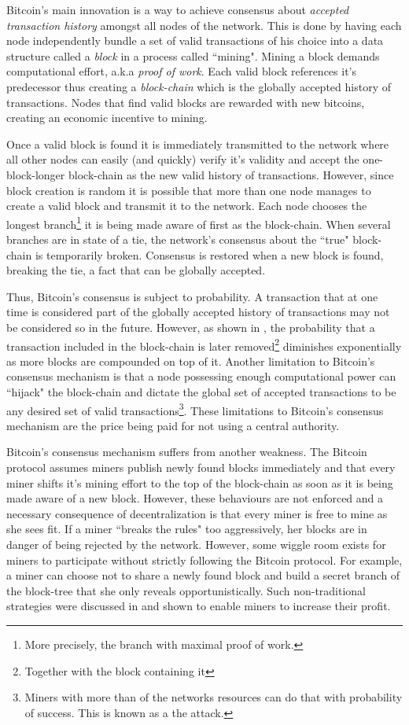 \documentclass[letterpaper,12pt]{report}
\begin{document}
Bitcoin's main innovation is a way to achieve consensus about \emph{accepted transaction history} amongst all nodes of the network. This is done by having each node independently bundle a set of valid transactions of his choice into a data structure called a \textit{block} in a process called ``mining". Mining a block demands computational effort, a.k.a \textit{proof of work}. Each valid block references it's predecessor thus creating a \textit{block-chain} which is the globally accepted history of transactions. Nodes that find valid blocks are rewarded with new bitcoins, creating an economic incentive to mining.

Once a valid block is found it is immediately transmitted to the network where all other nodes can easily (and quickly) verify it's validity and accept the one-block-longer block-chain as the new valid history of transactions. However, since block creation is random it is possible that more than one node manages to create a valid block and transmit it to the network. Each node chooses the longest branch\footnote{More precisely, the branch with maximal proof of work.} it is being made aware of first as the block-chain. When several branches are in state of a tie, the network's consensus about the ``true" block-chain is temporarily broken. Consensus is restored when a new block is found, breaking the tie, a fact that can be globally accepted. 

Thus, Bitcoin's consensus is subject to probability. A transaction that at one time is considered part of the globally accepted history of transactions may not be considered so in the future. However, as shown in \cite{Bitcoin}, the probability that a transaction included in the block-chain is later removed\footnote{Together with the block containing it} diminishes exponentially as more blocks are compounded on top of it. Another limitation to Bitcoin's consensus mechanism is that a node possessing enough computational power can ``hijack" the block-chain and dictate the global set of accepted transactions to be any desired set of valid transactions\footnote{Miners with more than  of the networks resources can do that with  probability of success. This is known as a the  attack.}. These limitations to Bitcoin's consensus mechanism are the price being paid for not using a central authority. 

Bitcoin's consensus mechanism suffers from another weakness. The Bitcoin protocol assumes miners publish newly found blocks immediately and that every miner shifts it's mining effort to the top of the block-chain as soon as it is being made aware of a new block. However, these behaviours are not enforced and a necessary consequence of decentralization is that every miner is free to mine as she sees fit. If a miner ``breaks the rules" too aggressively, her blocks are in danger of being rejected by the network. However, some wiggle room exists for miners to participate without strictly following the Bitcoin protocol. For example, a miner can choose not to share a newly found block and build a secret branch of the block-tree that she only reveals opportunistically. Such non-traditional strategies were discussed in \cite{Selfish,Lear} and shown to enable miners to increase their profit. 
\end{document}
